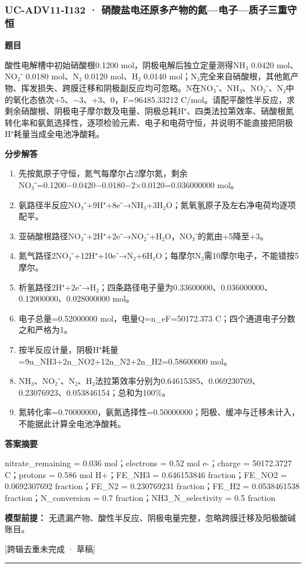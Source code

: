 \documentclass[UTF8,11pt,a4paper]{ctexart}
\begin{document}
\subsubsection*{UC-ADV11-I132 · 硝酸盐电还原多产物的氮—电子—质子三重守恒}
\noindent\textbf{题目}\par
酸性电解槽中初始硝酸根0.1200 mol，阴极电解后独立定量测得NH₃ 0.0420 mol、NO₂⁻ 0.0180 mol、N₂ 0.0120 mol、H₂ 0.0140 mol；N₂完全来自硝酸根，其他氮产物、挥发损失、跨膜迁移和阴极副反应均可忽略。N在NO₃⁻、NH₃、NO₂⁻、N₂中的氧化态依次+5、−3、+3、0，F=96485.33212 C/mol。请配平酸性半反应，求剩余硝酸根、阴极电子摩尔数及电量、阴极总耗H⁺、四类法拉第效率、硝酸根氮转化率和氨氮选择性，逐项检验元素、电子和电荷守恒，并说明不能直接把阴极H⁺耗量当成全电池净酸耗。\par
\medskip\noindent\textbf{分步解答}
\begin{enumerate}
\item 先按氮原子守恒，氮气每摩尔占2摩尔氮，剩余NO₃⁻=0.1200−0.0420−0.0180−2×0.0120=0.036000000 mol。
\item 氨路径半反应NO₃⁻+9H⁺+8e⁻→NH₃+3H₂O；氮氧氢原子及左右净电荷均逐项配平。
\item 亚硝酸根路径NO₃⁻+2H⁺+2e⁻→NO₂⁻+H₂O，NO₃⁻的氮由+5降至+3。
\item 氮气路径2NO₃⁻+12H⁺+10e⁻→N₂+6H₂O；每摩尔N₂需10摩尔电子，不能错按5摩尔。
\item 析氢路径2H⁺+2e⁻→H₂；四条路径电子量为0.33600000、0.036000000、0.12000000、0.028000000 mol。
\item 电子总量=0.52000000 mol，电量Q=n\_eF=50172.373 C；四个通道电子分数之和严格为1。
\item 按半反应计量，阴极H⁺耗量=9n\_NH3+2n\_NO2+12n\_N2+2n\_H2=0.58600000 mol。
\item NH₃、NO₂⁻、N₂、H₂法拉第效率分别为0.64615385、0.069230769、0.23076923、0.053846154；总和为100\%。
\item 氮转化率=0.70000000，氨氮选择性=0.50000000；阳极、缓冲与迁移未计入，不能据此计算全电池净酸耗。
\end{enumerate}
\noindent\textbf{答案摘要}\par
nitrate\_remaining = 0.036 mol；electrons = 0.52 mol e-；charge = 50172.3727 C；protons = 0.586 mol H+；FE\_NH3 = 0.646153846 fraction；FE\_NO2 = 0.0692307692 fraction；FE\_N2 = 0.230769231 fraction；FE\_H2 = 0.0538461538 fraction；N\_conversion = 0.7 fraction；NH3\_N\_selectivity = 0.5 fraction\par
\noindent\textbf{模型前提：}
无遗漏产物、酸性半反应、阴极电量完整，忽略跨膜迁移及阳极酸碱账目。\par
\noindent\textcolor{red!65!black}{[跨辑去重未完成 · 草稿]} \par
\medskip\hrule\medskip
{}
\end{document}
